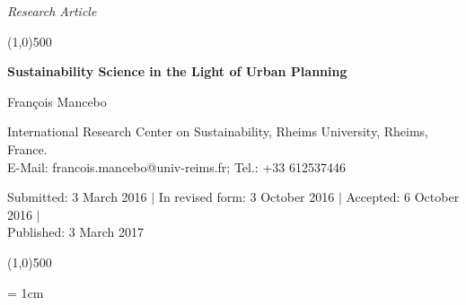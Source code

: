 \documentclass[10pt,a4paper]{article}
\begin{document}
\flushcolumns
\raggedcolumns



\pagestyle{document}
\thispagestyle{firstpage}


\vspace*{70pt}

\setlength{\parindent}{0cm}
\textit{Research Article}
\vspace*{-12pt}

\begin{center}
\line(1,0){500}
\end{center}

\vspace*{12pt}
\begin{flushleft}
\begin{LARGE}
\textbf{{\color{LibrelloColor} Sustainability Science in the Light of Urban Planning}}\\
\end{LARGE}

\vspace*{12pt}

François Mancebo

\vspace*{6pt}

International Research Center on Sustainability, Rheims University, Rheims, France.\\ E-Mail: francois.mancebo@univ-reims.fr; Tel.: +33 612537446

\vspace*{6pt}

%

Submitted: 3 March 2016 $\mid$ In revised form: 3 October 2016 $\mid$ Accepted: 6 October 2016 $\mid$\\
Published: 3 March 2017
\end{flushleft}
\setcounter{page}{26}


\vspace*{-18pt}
\begin{center}
\line(1,0){500}
\end{center}

\vspace*{12pt}

\begingroup\leftskip= 1cm\rightskip 1cm  
\end{document}
